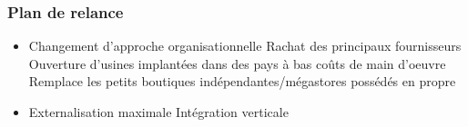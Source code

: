 	\subsubsection{Plan de relance}
	\begin{itemize}
		\item Changement d'approche organisationnelle
			\subitem Rachat des principaux fournisseurs
			\subitem Ouverture d'usines implantées dans des pays à bas coûts de main d'oeuvre
			\subitem Remplace les petits boutiques indépendantes/mégastores possédés en propre
		\item Externalisation maximale
			\subitem Intégration verticale
	\end{itemize}
